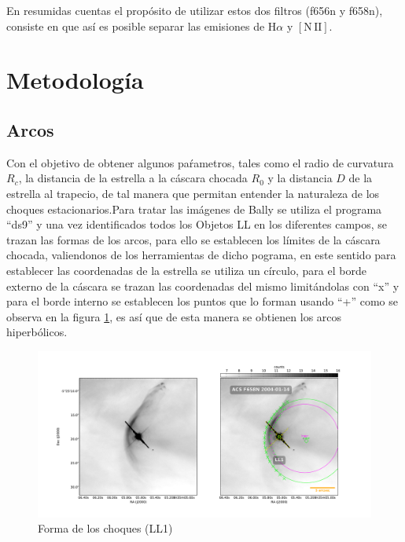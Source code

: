 \documentclass{article}
\newcommand\ha{\ensuremath{\mathrm{H}\alpha}}
\newcommand\nii{\ensuremath{\mathrm{[N\,II]}}}
\begin{document}
En resumidas cuentas el propósito de utilizar estos dos filtros (f656n y f658n), consiste en que así es posible separar las emisiones de \ha{} y \nii{}.       

\section{Metodología}
\label{sec:metodo}

\subsection{Arcos}
\label{sec:arcos}

Con el objetivo de obtener algunos paŕametros, tales como el  radio de curvatura \(R_{c}\), la distancia de la estrella a la cáscara chocada \(R_{0}\) y la distancia \(D\) de la estrella al trapecio, de tal manera  que permitan entender la naturaleza de los choques estacionarios.Para tratar las imágenes de Bally se utiliza el programa ``ds9'' y  una vez identificados todos los Objetos LL en los diferentes campos, se trazan las formas de los arcos, para ello se establecen los límites de la cáscara chocada, valiendonos de los herramientas de dicho pograma, en este sentido para establecer las coordenadas de la estrella se utiliza un círculo, para el borde externo de la cáscara se trazan las coordenadas del mismo limitándolas con ``x'' y para el borde interno se establecen los puntos que lo forman usando ``+'' como se observa en la figura \ref{fig:LL1-Bally}, es así que de esta manera se obtienen los  arcos hiperbólicos.

\begin{figure}
  \centering
  \includegraphics[width=\linewidth]{j8oc01010_wcs/LL1-Bally_01-images.pdf}
  \caption{Forma de los choques (LL1)}
  \label{fig:LL1-Bally}
\end{figure}
\end{document}
